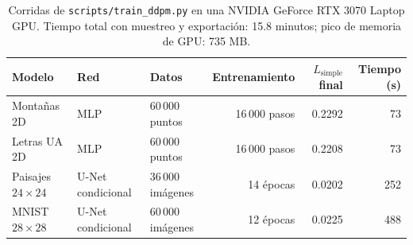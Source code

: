 \begin{table}[H]
\centering\small
\begin{tabular}{lllrrr}
\toprule
Modelo & Red & Datos & Entrenamiento & $L_{\text{simple}}$ final & Tiempo (s)\\
\midrule
Montañas 2D & MLP & 60\,000 puntos & 16\,000 pasos & 0.2292 & 73\\
Letras UA 2D & MLP & 60\,000 puntos & 16\,000 pasos & 0.2208 & 73\\
Paisajes $24\times24$ & U-Net condicional & 36\,000 imágenes & 14 épocas & 0.0202 & 252\\
MNIST $28\times28$ & U-Net condicional & 60\,000 imágenes & 12 épocas & 0.0225 & 488\\
\bottomrule
\end{tabular}
\caption{Corridas de \texttt{scripts/train\_ddpm.py} en una NVIDIA GeForce RTX 3070 Laptop GPU. Tiempo total con muestreo y exportación: 15.8 minutos; pico de memoria de GPU: 735 MB.}
\label{tab:metricas}
\end{table}
